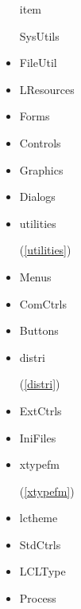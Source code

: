 \documentclass{report}
\begin{document}
\begin{itemize}
item \begin{ttfamily}SysUtils\end{ttfamily}\item \begin{ttfamily}FileUtil\end{ttfamily}\item \begin{ttfamily}LResources\end{ttfamily}\item \begin{ttfamily}Forms\end{ttfamily}\item \begin{ttfamily}Controls\end{ttfamily}\item \begin{ttfamily}Graphics\end{ttfamily}\item \begin{ttfamily}Dialogs\end{ttfamily}\item \begin{ttfamily}utilities\end{ttfamily}(\ref{utilities})\item \begin{ttfamily}Menus\end{ttfamily}\item \begin{ttfamily}ComCtrls\end{ttfamily}\item \begin{ttfamily}Buttons\end{ttfamily}\item \begin{ttfamily}distri\end{ttfamily}(\ref{distri})\item \begin{ttfamily}ExtCtrls\end{ttfamily}\item \begin{ttfamily}IniFiles\end{ttfamily}\item \begin{ttfamily}xtypefm\end{ttfamily}(\ref{xtypefm})\item \begin{ttfamily}lctheme\end{ttfamily}\item \begin{ttfamily}StdCtrls\end{ttfamily}\item \begin{ttfamily}LCLType\end{ttfamily}\item \begin{ttfamily}Process\end{ttfamily}\end{itemize}
\end{document}
